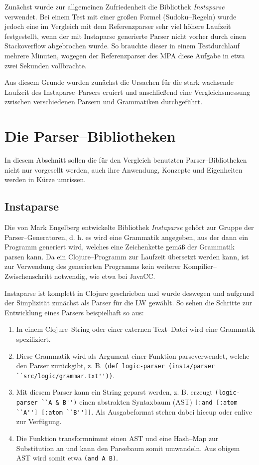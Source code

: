 \documentclass[ngerman,a4paper,abstracton,open=right,twoside=false,toc=listofnumbered,bibtotocnumbered]{scrreprt}
\begin{document}
Zunächst wurde zur allgemeinen Zufriedenheit die Bibliothek \emph{Instaparse} verwendet. Bei einem Test mit einer großen Formel (Sudoku--Regeln) wurde jedoch eine im Vergleich mit dem Referenzparser sehr viel höhere Laufzeit festgestellt, wenn der mit Instaparse generierte Parser nicht vorher durch einen Stackoverflow abgebrochen wurde. So brauchte dieser in einem Testdurchlauf mehrere Minuten, wogegen der Referenzparser des MPA diese Aufgabe in etwa zwei Sekunden vollbrachte.

Aus diesem Grunde wurden zunächst die Ursachen für die stark wachsende Laufzeit des Instaparse--Parsers eruiert und anschließend eine Vergleichsmessung zwischen verschiedenen Parsern und Grammatiken durchgeführt.

\section{Die Parser--Bibliotheken}

In diesem Abschnitt sollen die für den Vergleich benutzten Parser--Bibliotheken nicht nur vorgesellt werden, auch ihre Anwendung, Konzepte und Eigenheiten werden in Kürze umrissen.

\subsection{Instaparse}

Die von Mark Engelberg entwickelte Bibliothek \emph{Instaparse} gehört zur Gruppe der Parser--Generatoren, d. h. es wird eine Grammatik angegeben, aus der dann ein Programm generiert wird, welches eine Zeichenkette gemäß der Grammatik parsen kann. Da ein Clojure--Programm zur Laufzeit übersetzt werden kann, ist zur Verwendung des generierten Programms kein weiterer Kompilier--Zwischenschritt notwendig, wie etwa bei JavaCC. \cite{instaparse}

Instaparse ist komplett in Clojure geschrieben und wurde deswegen und aufgrund der Simplizität zunächst als Parser für die LW gewählt. So sehen die Schritte zur Entwicklung eines Parsers beispielhaft so aus:

\begin{enumerate}
	\item In einem Clojure--String oder einer externen Text--Datei wird eine Grammatik spezifiziert.
	\item Diese Grammatik wird als Argument einer Funktion \glqq parse\grqq verwendet, welche den Parser zurückgibt, z. B. \lstinline|(def logic-parser (insta/parser ``src/logic/grammar.txt''))|.
	\item Mit diesem Parser kann ein String geparst werden, z. B. erzeugt \lstinline|(logic-parser ``A & B'')| einen abstrakten Syntaxbaum (AST) \lstinline|[:and [:atom ``A''] [:atom ``B'']]|. Als Ausgabeformat stehen dabei hiccup oder enlive zur Verfügung.
	\item Die Funktion \glqq transform\grqq nimmt einen AST und eine Hash--Map zur Substitution an und kann den Parsebaum somit umwandeln. Aus obigem AST wird somit etwa \lstinline|(and A B)|.
\end{enumerate}
\end{document}
